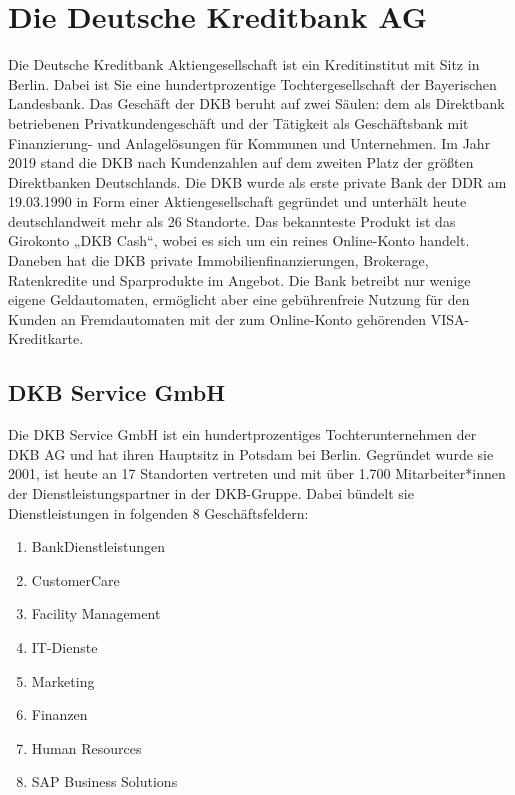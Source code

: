 \section{Die Deutsche Kreditbank AG}\label{einleitung}

Die Deutsche Kreditbank Aktiengesellschaft ist ein Kreditinstitut mit Sitz in Berlin. Dabei ist Sie eine hundertprozentige Tochtergesellschaft der Bayerischen Landesbank. Das Geschäft der DKB beruht auf zwei Säulen: dem als Direktbank betriebenen Privatkundengeschäft und der Tätigkeit als Geschäftsbank mit Finanzierung- und Anlagelösungen für Kommunen und Unternehmen. Im Jahr 2019 stand die DKB nach Kundenzahlen auf dem zweiten Platz der größten Direktbanken Deutschlands. 
Die DKB wurde als erste private Bank der DDR am 19.03.1990 in Form einer Aktiengesellschaft gegründet und unterhält heute deutschlandweit mehr als 26 Standorte. Das bekannteste Produkt ist das Girokonto „DKB Cash“, wobei es sich um ein reines Online-Konto handelt. Daneben hat die DKB private Immobilienfinanzierungen, Brokerage, Ratenkredite und Sparprodukte im Angebot. Die Bank betreibt nur wenige eigene Geldautomaten, ermöglicht aber eine gebührenfreie Nutzung für den Kunden an Fremdautomaten mit der zum Online-Konto gehörenden VISA-Kreditkarte.

\subsection{DKB Service GmbH}\label{einleitung}

Die DKB Service GmbH ist ein hundertprozentiges Tochterunternehmen der DKB AG und hat ihren Hauptsitz in Potsdam bei Berlin. Gegründet wurde sie 2001, ist heute an 17 Standorten vertreten und mit über 1.700 Mitarbeiter*innen der Dienstleistungspartner in der DKB-Gruppe. Dabei bündelt sie Dienstleistungen in folgenden 8 Geschäftsfeldern:

\begin{enumerate}
	\item BankDienstleistungen
	\item CustomerCare
	\item Facility Management
	\item IT-Dienste
	\item Marketing
	\item Finanzen
	\item Human Resources
	\item SAP Business Solutions
\end{enumerate}

